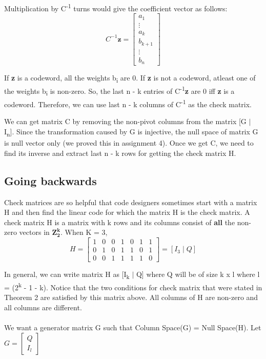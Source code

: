 \documentclass[11pt,a4paper]{article}
\begin{document}
Multiplication by C\textsuperscript{-1} turns would give the coefficient vector as follows:
$$
C^{-1}\mathbf{z} = 
\begin{bmatrix}
    a_1\\
    \vdots\\
    a_k\\
    b_{k+1}\\
    \vdots\\
    b_n
\end{bmatrix}
$$

If \textbf{z} is a codeword, all the weights b\textsubscript{i} are 0. If \textbf{z} is not a codeword, atleast one of the weights b\textsubscript{i} is non-zero. So, the last n - k entries of C\textsuperscript{-1}\textbf{z} are 0 iff \textbf{z} is a codeword. Therefore, we can use last n - k columns of C\textsuperscript{-1} as the check matrix.

We can get matrix C by removing the non-pivot columns from the matrix [G $\mid$ I\textsubscript{n}]. Since the transformation caused by G is injective, the null space of matrix G is null vector only (we proved this in assignment 4). Once we get C, we need to find its inverse and extract last n - k rows for getting the check matrix H.

\subsection{Going backwards}
Check matrices are so helpful that code designers sometimes start with a matrix H and then find the linear code for which the matrix H is the check matrix. A check matrix H is a matrix with k rows and its columns consist of \textbf{all} the non-zero vectors in $\mathbf{Z_2^k}$. When K = 3, 
$$
H = 
\begin{bmatrix}
    1 & 0 & 0 & 1 & 0 & 1 & 1\\
    0 & 1 & 0 & 1 & 1 & 0 & 1\\
    0 & 0 & 1 & 1 & 1 & 1 & 0
\end{bmatrix}
 = [I_3 \mid Q]
$$

In general, we can write matrix H as [I\textsubscript{k} $\mid$ Q] where Q will be of size k x l where l = (2\textsuperscript{k} - 1 - k). Notice that the two conditions for check matrix that were stated in Theorem 2 are satisfied by this matrix above. All columns of H are non-zero and all columns are different.


\paragraph{}
We want a generator matrix G such that Column Space(G) = Null Space(H). Let $G = \begin{bmatrix}
    Q \\ I_{l}
\end{bmatrix}$
\end{document}
